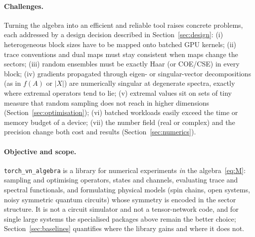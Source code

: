 \documentclass[11pt]{article}
\begin{document}
\paragraph{Challenges.} Turning the algebra into an efficient and reliable tool raises concrete problems, each
addressed by a design decision described in Section~\ref{sec:design}: (i) heterogeneous block sizes have to be
mapped onto batched GPU kernels; (ii) trace conventions and dual maps must stay consistent when maps change the
sectors; (iii) random ensembles must be exactly Haar (or COE/CSE) in every block; (iv) gradients propagated through
eigen- or singular-vector decompositions (as in $f(A)$ or $|X|$) are numerically singular at degenerate spectra,
exactly where extremal operators tend to lie; (v) extremal
values sit on sets of tiny measure that random sampling does not reach in higher dimensions
(Section~\ref{sec:optimisation}); (vi) batched workloads easily exceed the time or memory budget of a device;
(vii) the number field (real or complex) and the precision change both cost and results
(Section~\ref{sec:numerics}).

\paragraph{Objective and scope.} \texttt{torch\_vn\_algebra} is a library for numerical experiments \emph{in}
the algebra~\eqref{eq:M}: sampling and optimising operators, states and channels, evaluating trace and spectral
functionals, and formulating physical models (spin chains, open systems, noisy symmetric quantum circuits) whose
symmetry is encoded in the sector structure. It is not a circuit simulator and not a tensor-network code, and for
single large systems the specialised packages above remain the better choice; Section~\ref{sec:baselines}
quantifies where the library gains and where it does not.
\end{document}
